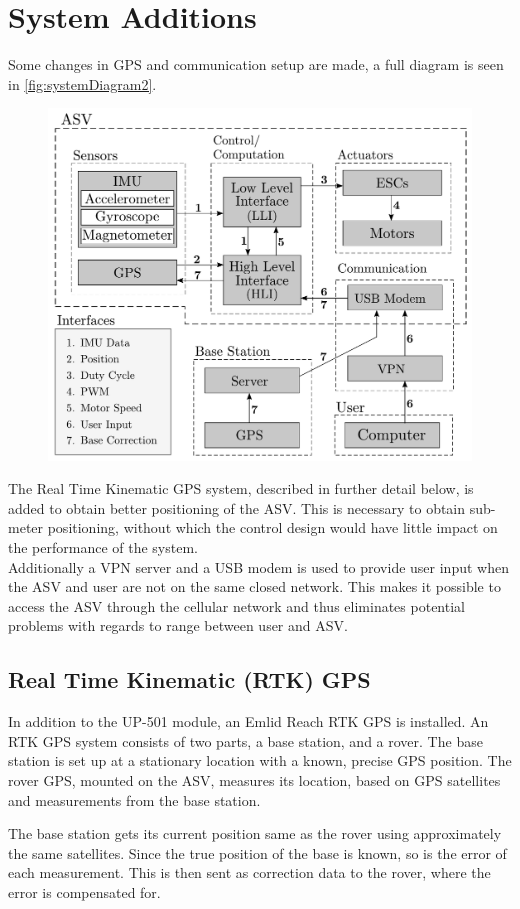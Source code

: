 \section{System Additions}
Some changes in GPS and communication setup are made, a full diagram is seen in \autoref{fig:systemDiagram2}.

\begin{figure}[H]
  \includegraphics[width=.65\textwidth]{figures/systemDiagram2}
  \caption{}
  \label{fig:systemDiagram2}
\end{figure}

The Real Time Kinematic GPS system, described in further detail below, is added to obtain better positioning of the ASV. This is necessary to obtain sub-meter positioning, without which the control design would have little impact on the performance of the system.\\
Additionally a VPN server and a USB modem is used to provide user input when the ASV and user are not on the same closed network. This makes it possible to access the ASV through the cellular network and thus eliminates potential problems with regards to range between user and ASV.

\subsection{Real Time Kinematic (RTK) GPS}
In addition to the UP-501 module, an Emlid Reach RTK GPS is installed. 
An RTK GPS system consists of two parts, a base station, and a rover.
The base station is set up at a stationary location with a known, precise GPS position.
The rover GPS, mounted on the ASV, measures its location, based on GPS satellites and measurements from the base station.

The base station gets its current position same as the rover using approximately the same satellites. Since the true position of the base is known, so is the error of each measurement. This is then sent as correction data to the rover, where the error is compensated for.

